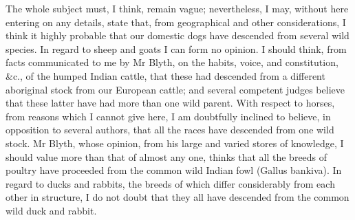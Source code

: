 \indent The whole subject must, I think, remain vague; nevertheless, I may, without here entering on any details, state that, from geographical and other considerations, I think it highly probable that our domestic dogs have descended from several wild species. In regard to sheep and goats I can form no opinion. I should think, from facts communicated to me by Mr Blyth, on the habits, voice, and constitution, \&c., of the humped Indian cattle, that these had descended from a different aboriginal stock from our European cattle; and several competent judges believe that these latter have had more than one wild parent. With respect to horses, from reasons which I cannot give here, I am doubtfully inclined to believe, in opposition to several authors, that all the races have descended from one wild stock. Mr Blyth, whose opinion, from his large and varied stores of knowledge, I should value more than that of almost any one, thinks that all the breeds of poultry have proceeded from the common wild Indian fowl (Gallus bankiva).  In regard to ducks and rabbits, the breeds of which differ considerably from each other in structure, I do not doubt that they all have descended from the common wild duck and rabbit.  \\
